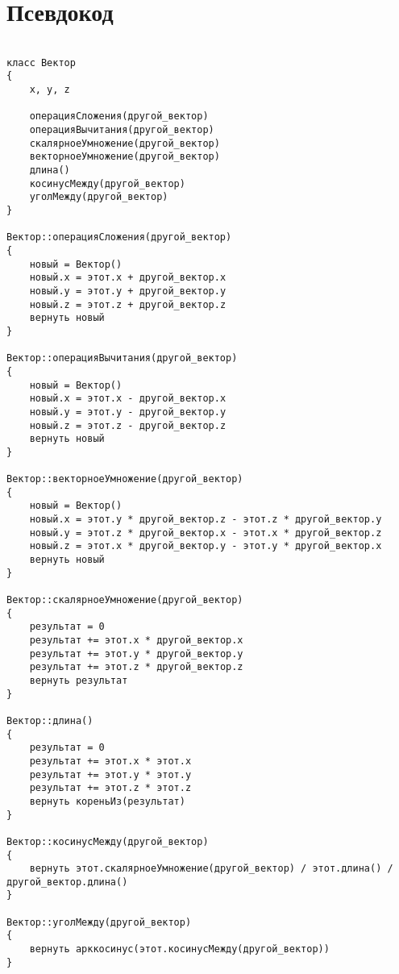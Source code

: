 \label{sec:pseudocode}
\section{Псевдокод}

\fontsize{8pt}{10pt}\selectfont
\begin{verbatim}

класс Вектор
{
    x, y, z

    операцияСложения(другой_вектор)
    операцияВычитания(другой_вектор)
    скалярноеУмножение(другой_вектор)
    векторноеУмножение(другой_вектор)
    длина()
    косинусМежду(другой_вектор)
    уголМежду(другой_вектор)
}

Вектор::операцияСложения(другой_вектор)
{
    новый = Вектор()
    новый.x = этот.x + другой_вектор.x
    новый.y = этот.y + другой_вектор.y
    новый.z = этот.z + другой_вектор.z
    вернуть новый
}

Вектор::операцияВычитания(другой_вектор)
{
    новый = Вектор()
    новый.x = этот.x - другой_вектор.x
    новый.y = этот.y - другой_вектор.y
    новый.z = этот.z - другой_вектор.z
    вернуть новый
}

Вектор::векторноеУмножение(другой_вектор)
{
    новый = Вектор()
    новый.x = этот.y * другой_вектор.z - этот.z * другой_вектор.y
    новый.y = этот.z * другой_вектор.x - этот.x * другой_вектор.z
    новый.z = этот.x * другой_вектор.y - этот.y * другой_вектор.x
    вернуть новый
}

Вектор::скалярноеУмножение(другой_вектор)
{
    результат = 0
    результат += этот.x * другой_вектор.x
    результат += этот.y * другой_вектор.y
    результат += этот.z * другой_вектор.z
    вернуть результат
}

Вектор::длина()
{
    результат = 0
    результат += этот.x * этот.x
    результат += этот.y * этот.y
    результат += этот.z * этот.z
    вернуть кореньИз(результат)
}

Вектор::косинусМежду(другой_вектор)
{
    вернуть этот.скалярноеУмножение(другой_вектор) / этот.длина() / другой_вектор.длина()
}

Вектор::уголМежду(другой_вектор)
{
    вернуть арккосинус(этот.косинусМежду(другой_вектор))
}

\end{verbatim}